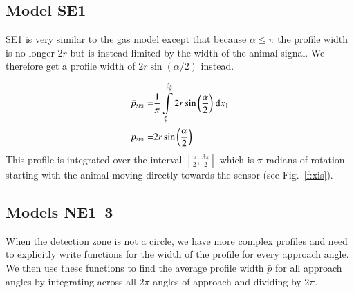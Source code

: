 \subsection{Model SE1} \label{SE1}
SE1 is very similar to the gas model except that because $\alpha \le \pi$ the profile width is no longer $2r$ but is instead limited by the width of the animal signal. We therefore get a profile width of $2r\sin(\alpha/2)$ instead. 

\begin{align}
    \bar{p}_{\text{\tiny{SE1}}} =&\frac{1}{\pi} \int\limits_{\frac{\pi}{2}}^{\frac{3 \pi}{2}}2 r \sin{\left (\frac{\alpha}{2} \right )}\;\mathrm{d}x_{1}\label{pSE1Def}\\
    \bar{p}_{\text{\tiny{SE1}}}  =& 2 r \sin{\left (\frac{\alpha}{2} \right )}\label{pSE1Sln}
\end{align}
This profile is integrated over the interval $[\frac{\pi}{2}, \frac{3\pi}{2}]$ which is $\pi$ radians of rotation starting with the animal moving directly towards the sensor (see Fig.~\ref{f:xis}).

\subsection{ Models NE1--3} \label{NE}

When the detection zone is not a circle, we have more complex profiles  and need to explicitly write functions for the width of the profile for every approach angle. We then use these functions to find the average profile width $\bar{p}$ for all approach angles by integrating across all $2\pi$ angles of approach and dividing by $2\pi$. 





